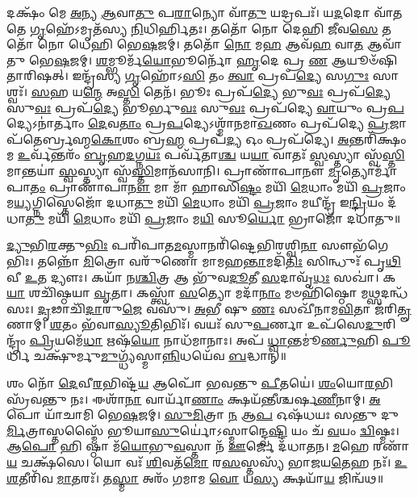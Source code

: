 𑌦𑌕𑍍𑌷𑌂᳴ 𑌮𑍇 \ul{𑌅}\-𑌨𑍍𑌯 \ul{𑌆}\-𑌵𑌾\-\ul{𑌤𑍁} 𑌪\-\ul{𑌰𑌾}\-𑌨𑍍𑌯𑍋 𑌵𑌾᳴\-\ul{𑌤𑍁} 𑌯𑌦𑍍𑌰𑌪𑌃᳴। 𑌯\-\ul{𑌦}\-𑌦𑍋 𑌵𑌾᳴𑌤𑌤𑍇 \ul{𑌗𑍃}\-𑌹𑍇᳴𑌽𑌮𑍃𑌤᳴𑌸𑍍𑌯 \ul{𑌨𑌿}\-𑌧𑌿𑌰𑍍\mbox{}\-\ul{𑌹𑌿}\-𑌤𑌃। 𑌤𑌤𑍋᳴ 𑌨𑍋 𑌦𑍇𑌹𑌿 \ul{𑌜𑍀}\-𑌵\-\ul{𑌸𑍇} 𑌤𑌤𑍋᳴ 𑌨𑍋 𑌧𑍇𑌹𑌿 𑌭𑍇\-\ul{𑌷}\-𑌜𑌮𑍍। 𑌤𑌤𑍋᳴ \ul{𑌨𑍋} 𑌮\-\ul{𑌹} 𑌆𑌵᳴\-\ul{𑌹} 𑌵𑌾\-\ul{𑌤} 𑌆𑌵𑌾᳴𑌤𑍁 𑌭𑍇\-\ul{𑌷}\-𑌜𑌮𑍍। \ul{𑌶}\-𑌮𑍍𑌭𑍂𑌰𑍍𑌮᳴\-\ul{𑌯𑍋}\-𑌭𑍂𑌰𑍍𑌨𑍋᳴ \ul{𑌹𑍃}\-𑌦𑍇 𑌪𑍍𑌰 \ul{𑌣} 𑌆𑌯𑍂𑍞᳴𑌷𑌿 𑌤𑌾𑌰𑌿𑌷𑌤𑍍। 𑌇𑌨𑍍𑌦𑍍𑌰᳴𑌸𑍍𑌯 \ul{𑌗𑍃}\-𑌹𑍋᳴𑌽\-\ul{𑌸𑌿} 𑌤𑌂 \ul{𑌤𑍍𑌵𑌾} 𑌪𑍍𑌰𑌪᳴\-\ul{𑌦𑍍𑌯𑍇} 𑌸\-\ul{𑌗𑍁𑌃} 𑌸𑌾𑌶𑍍𑌵𑌃᳴। \ul{𑌸}\-𑌹 𑌯\-\ul{𑌨𑍍𑌮𑍇} 𑌅\-\ul{𑌸𑍍𑌤𑌿} 𑌤𑍇𑌨᳴। 𑌭𑍂𑌃 𑌪𑍍𑌰𑌪᳴\-\ul{𑌦𑍍𑌯𑍇} 𑌭𑍁\-\ul{𑌵𑌃} 𑌪𑍍𑌰𑌪᳴\-\ul{𑌦𑍍𑌯𑍇} 𑌸𑍁\-\ul{𑌵𑌃} 𑌪𑍍𑌰𑌪᳴\-\ul{𑌦𑍍𑌯𑍇} 𑌭𑍂𑌰𑍍𑌭𑍁\-\ul{𑌵𑌃} 𑌸𑍁\-\ul{𑌵𑌃} 𑌪𑍍𑌰𑌪᳴𑌦𑍍𑌯𑍇 \ul{𑌵𑌾}\-𑌯𑍁𑌂 𑌪𑍍𑌰\-\ul{𑌪}\-𑌦𑍍𑌯𑍇𑌽𑌨𑌾॑𑌰𑍍𑌤𑌾𑌂 \ul{𑌦𑍇}\-𑌵\-\ul{𑌤𑌾𑌂} 𑌪𑍍𑌰\-\ul{𑌪}\-𑌦𑍍𑌯𑍇𑌽𑌶𑍍𑌮𑌾᳴𑌨𑌮𑌾\-\ul{𑌖}\-𑌣𑌂 𑌪𑍍𑌰𑌪᳴𑌦𑍍𑌯𑍇 \ul{𑌪𑍍𑌰}\-𑌜𑌾𑌪᳴𑌤𑍇𑌰𑍍𑌬𑍍𑌰𑌹𑍍𑌮\-\ul{𑌕𑍋}\-𑌶𑌂 𑌬𑍍𑌰\-\ul{𑌹𑍍𑌮} 𑌪𑍍𑌰𑌪᳴\-\ul{𑌦𑍍𑌯} 𑌓𑌂 𑌪𑍍𑌰𑌪᳴𑌦𑍍𑌯𑍇। \ul{𑌅}\-𑌨𑍍𑌤𑌰𑌿᳴𑌕𑍍𑌷𑌂 𑌮 \ul{𑌉}\-𑌰𑍍𑌵᳴𑌨𑍍𑌤𑌰𑌂᳴ \ul{𑌬𑍃}\-𑌹\-\ul{𑌦}\-𑌗𑍍𑌨\-\ul{𑌯𑌃} 𑌪𑌰𑍍𑌵᳴𑌤𑌾\-\ul{𑌶𑍍𑌚} 𑌯\-\ul{𑌯𑌾} 𑌵𑌾𑌤𑌃᳴ \ul{𑌸𑍍𑌵}\-𑌸𑍍𑌤𑍍𑌯𑌾 𑌸𑍍𑌵᳴\-\ul{𑌸𑍍𑌤𑌿}\-𑌮𑌾𑌨𑍍𑌤𑌯𑌾॑ \ul{𑌸𑍍𑌵}\-𑌸𑍍𑌤𑍍𑌯𑌾 𑌸𑍍𑌵᳴\-\ul{𑌸𑍍𑌤𑌿}\-𑌮𑌾𑌨᳴𑌸𑌾𑌨𑌿। 𑌪𑍍𑌰𑌾𑌣𑌾᳴𑌪𑌾𑌨𑍗 \ul{𑌮𑍃}\-𑌤𑍍𑌯𑍋𑌰𑍍𑌮𑌾᳴ 𑌪𑌾\-\ul{𑌤𑌂} 𑌪𑍍𑌰𑌾𑌣𑌾᳴𑌪𑌾\-\ul{𑌨𑍗} 𑌮𑌾 𑌮𑌾᳴ 𑌹𑌾𑌸𑌿\-\ul{𑌷𑍍𑌟𑌂} 𑌮𑌯𑌿᳴ \ul{𑌮𑍇}\-𑌧𑌾𑌂 𑌮𑌯𑌿᳴ \ul{𑌪𑍍𑌰}\-𑌜𑌾𑌂 𑌮\-\ul{𑌯𑍍𑌯}\-𑌗𑍍𑌨𑌿𑌸𑍍𑌤𑍇𑌜𑍋᳴ 𑌦𑌧𑌾\-\ul{𑌤𑍁} 𑌮𑌯𑌿᳴ \ul{𑌮𑍇}\-𑌧𑌾𑌂 𑌮𑌯𑌿᳴ \ul{𑌪𑍍𑌰}\-𑌜𑌾𑌂 𑌮𑌯𑍀𑌨𑍍𑌦𑍍𑌰᳴ 𑌇\-\ul{𑌨𑍍𑌦𑍍𑌰𑌿}\-𑌯𑌂 𑌦᳴𑌧𑌾\-\ul{𑌤𑍁} 𑌮𑌯𑌿᳴ \ul{𑌮𑍇}\-𑌧𑌾𑌂 𑌮𑌯𑌿᳴ \ul{𑌪𑍍𑌰}\-𑌜𑌾𑌂 𑌮\-\ul{𑌯𑌿} 𑌸𑍂\-\ul{𑌰𑍍𑌯𑍋} 𑌭𑍍𑌰𑌾𑌜𑍋᳴ 𑌦𑌧𑌾𑌤𑍁॥

\-\ul{𑌦𑍍𑌯𑍁}\-𑌭𑌿\-\ul{𑌰}\-𑌕𑍍𑌤𑍁\-\ul{𑌭𑌿𑌃} 𑌪𑌰𑌿᳴𑌪𑌾𑌤\-\ul{𑌮}\-𑌸𑍍𑌮𑌾𑌨𑌰𑌿᳴𑌷𑍍𑌟𑍇𑌭𑌿𑌰𑌶𑍍𑌵𑌿\-\ul{𑌨𑌾} 𑌸𑍗𑌭᳴𑌗𑍇𑌭𑌿𑌃। 𑌤𑌨𑍍𑌨𑍋᳴ \ul{𑌮𑌿}\-𑌤𑍍𑌰𑍋 𑌵𑌰𑍁᳴𑌣𑍋 𑌮𑌾𑌮𑌹\-\ul{𑌨𑍍𑌤𑌾}\-𑌮𑌦𑌿᳴\-\ul{𑌤𑌿𑌃} 𑌸𑌿𑌨𑍍𑌧𑍁𑌃᳴ 𑌪𑍃\-\ul{𑌥𑌿}\-𑌵𑍀 \ul{𑌉}\-𑌤 𑌦𑍍𑌯𑍗𑌃। 𑌕𑌯𑌾᳴ 𑌨\-\ul{𑌶𑍍𑌚𑌿}\-𑌤𑍍𑌰 𑌆 𑌭𑍁᳴𑌵\-\ul{𑌦𑍂}\-𑌤𑍀 \ul{𑌸}\-𑌦𑌾𑌵𑍃᳴\-\ul{𑌧𑌃} 𑌸𑌖𑌾॑। 𑌕\-\ul{𑌯𑌾} 𑌶𑌚𑌿᳴𑌷𑍍𑌠𑌯𑌾 \ul{𑌵𑍃}\-𑌤𑌾। 𑌕𑌸𑍍𑌤𑍍𑌵𑌾᳴ \ul{𑌸}\-𑌤𑍍𑌯𑍋 𑌮𑌦𑌾᳴\-\ul{𑌨𑌾𑌂} 𑌮𑍞𑌹𑌿᳴𑌷𑍍𑌠𑍋 𑌮\-\ul{𑌥𑍍𑌸}\-𑌦𑌨𑍍𑌧᳴𑌸𑌃। \ul{𑌦𑍃}\-𑌢𑌾𑌚𑌿᳴\-\ul{𑌦𑌾}\-𑌰𑍁\-\ul{𑌜𑍇} 𑌵𑌸𑍁᳴। \ul{𑌅}\-𑌭𑍀 𑌷𑍁 \ul{𑌣𑌃} 𑌸𑌖𑍀᳴𑌨𑌾𑌮\-\ul{𑌵𑌿}\-𑌤𑌾 𑌜᳴𑌰𑌿\-\ul{𑌤𑍄}\-𑌣𑌾𑌮𑍍। \ul{𑌶}\-𑌤𑌂 𑌭᳴𑌵𑌾\-\ul{𑌸𑍍𑌯𑍂}\-𑌤𑌿𑌭𑌿𑌃᳴। 𑌵𑌯𑌃᳴ 𑌸𑍁\-\ul{𑌪}\-𑌰𑍍𑌣𑌾 𑌉𑌪᳴𑌸𑍇\-\ul{𑌦𑍁}\-𑌰𑌿𑌨𑍍𑌦𑍍𑌰𑌂᳴ \ul{𑌪𑍍𑌰𑌿}\-𑌯𑌮𑍇᳴\-\ul{𑌧𑌾} 𑌋𑌷᳴\-\ul{𑌯𑍋} 𑌨𑌾𑌧᳴𑌮𑌾𑌨𑌾𑌃। 𑌅𑌪᳴ \ul{𑌧𑍍𑌵𑌾}\-𑌨𑍍𑌤𑌮𑍂॑\-\ul{𑌰𑍍𑌣𑍁}\-𑌹𑌿 \ul{𑌪𑍂}\-𑌰𑍍𑌧𑌿 𑌚𑌕𑍍𑌷𑍁᳴𑌰𑍍𑌮𑍁\-\ul{𑌮𑍁}\-𑌗𑍍𑌧𑍍𑌯᳴𑌸𑍍𑌮𑌾\-\ul{𑌨𑍍𑌨𑌿}\-𑌧𑌯𑍇᳴𑌵 \ul{𑌬}\-𑌦𑍍𑌧𑌾𑌨𑍍॥

𑌶𑌂 𑌨𑍋᳴ \ul{𑌦𑍇}\-𑌵𑍀\-\ul{𑌰}\-𑌭𑌿𑌷𑍍𑌟᳴\-\ul{𑌯} 𑌆𑌪𑍋᳴ 𑌭𑌵𑌨𑍍𑌤𑍁 \ul{𑌪𑍀}\-𑌤𑌯𑍇॑। \ul{𑌶𑌂}\-𑌯𑍋\-\ul{𑌰}\-𑌭𑌿𑌸𑍍𑌰᳴𑌵𑌨𑍍𑌤𑍁 𑌨𑌃। 𑌈𑌶𑌾᳴\-\ul{𑌨𑌾} 𑌵𑌾𑌰𑍍𑌯𑌾᳴\-\ul{𑌣𑌾𑌂} 𑌕𑍍𑌷𑌯᳴𑌨𑍍𑌤𑍀𑌶𑍍𑌚𑌰𑍍\mbox{}𑌷\-\ul{𑌣𑍀}\-𑌨𑌾𑌮𑍍। \ul{𑌅}\-𑌪𑍋 𑌯𑌾᳴𑌚𑌾𑌮𑌿 𑌭𑍇\-\ul{𑌷}\-𑌜𑌮𑍍। \ul{𑌸𑍁}\-\-\ul{𑌮𑌿}\-𑌤𑍍𑌰𑌾 \ul{𑌨} 𑌆\-\ul{𑌪} 𑌓𑌷᳴𑌧𑌯𑌃 𑌸𑌨𑍍𑌤𑍁 𑌦𑍁\-\ul{𑌰𑍍𑌮𑌿}\-𑌤𑍍𑌰𑌾𑌸𑍍𑌤𑌸𑍍𑌮𑍈᳴ 𑌭𑍂𑌯𑌾\-\ul{𑌸𑍁}\-𑌰𑍍𑌯𑍋॑𑌽𑌸𑍍𑌮𑌾𑌨𑍍𑌦𑍍𑌵𑍇\-\ul{𑌷𑍍𑌟𑌿} 𑌯𑌂 𑌚᳴ \ul{𑌵}\-𑌯𑌂 \ul{𑌦𑍍𑌵𑌿}\-𑌷𑍍𑌮𑌃। 𑌆\-\ul{𑌪𑍋} 𑌹𑌿 𑌷𑍍𑌠𑌾 𑌮᳴\-\ul{𑌯𑍋}\-𑌭𑍁\-\ul{𑌵}\-𑌸𑍍𑌤𑌾 𑌨᳴ \ul{𑌊}\-𑌰𑍍𑌜𑍇 𑌦᳴𑌧𑌾𑌤𑌨। \ul{𑌮}\-𑌹𑍇 𑌰𑌣𑌾᳴\-\ul{𑌯} 𑌚𑌕𑍍𑌷᳴𑌸𑍇। 𑌯𑍋 𑌵𑌃᳴ \ul{𑌶𑌿}\-𑌵𑌤᳴\-\ul{𑌮𑍋} 𑌰\-\ul{𑌸}\-𑌸𑍍𑌤𑌸𑍍𑌯᳴ 𑌭𑌾𑌜𑌯\-\ul{𑌤𑍇}\-𑌹 𑌨𑌃᳴। \ul{𑌉}\-\-\ul{𑌶}\-𑌤𑍀𑌰𑌿᳴𑌵 \ul{𑌮𑌾}\-𑌤𑌰𑌃᳴। 𑌤\-\ul{𑌸𑍍𑌮𑌾} 𑌅𑌰𑌂᳴ 𑌗𑌮𑌾𑌮 \ul{𑌵𑍋} 𑌯\-\ul{𑌸𑍍𑌯} 𑌕𑍍𑌷𑌯𑌾᳴\-\ul{𑌯} 𑌜𑌿𑌨𑍍𑌵᳴𑌥॥

